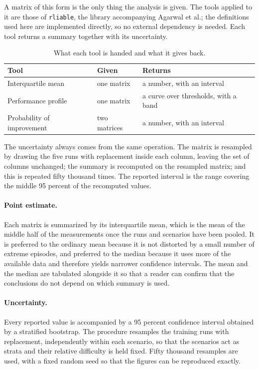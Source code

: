 \documentclass[11pt,a4paper]{article}
\begin{document}
A matrix of this form is the only thing the analysis is given. The tools applied
to it are those of \texttt{rliable}, the library accompanying Agarwal et al.;
the definitions used here are implemented directly, so no external dependency is
needed. Each tool returns a summary together with its uncertainty.

\begin{table}[h]
\centering
\begin{tabular}{@{}lll@{}}
\toprule
Tool & Given & Returns \\
\midrule
Interquartile mean         & one matrix  & a number, with an interval \\
Performance profile        & one matrix  & a curve over thresholds, with a band \\
Probability of improvement & two matrices & a number, with an interval \\
\bottomrule
\end{tabular}
\caption{What each tool is handed and what it gives back.}
\label{tab:tools}
\end{table}

The uncertainty always comes from the same operation. The matrix is resampled by
drawing the five runs with replacement inside each column, leaving the set of
columns unchanged; the summary is recomputed on the resampled matrix; and this
is repeated fifty thousand times. The reported interval is the range covering
the middle 95 percent of the recomputed values.

\paragraph{Point estimate.} Each matrix is summarized by its interquartile mean,
which is the mean of the middle half of the measurements once the runs and
scenarios have been pooled. It is preferred to the ordinary mean because it is
not distorted by a small number of extreme episodes, and preferred to the median
because it uses more of the available data and therefore yields narrower
confidence intervals. The mean and the median are tabulated alongside it so that
a reader can confirm that the conclusions do not depend on which summary is
used.

\paragraph{Uncertainty.} Every reported value is accompanied by a 95 percent
confidence interval obtained by a stratified bootstrap. The procedure resamples
the training runs with replacement, independently within each scenario, so that
the scenarios act as strata and their relative difficulty is held fixed. Fifty
thousand resamples are used, with a fixed random seed so that the figures can be
reproduced exactly.
\end{document}
